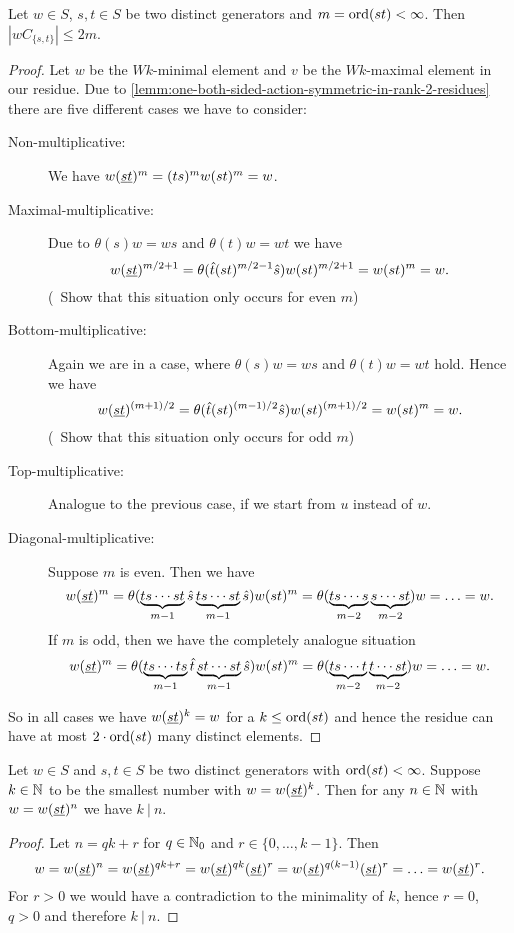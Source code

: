 \begin{lemm}
	Let $w \in S$, $s,t \in S$ be two distinct generators and $m = \operatorname{ord}(st) < \infty$. Then $|wC_{\{s,t\}}| \leq 2m$.

	\begin{proof}
		Let $w$ be the $Wk$-minimal element and $v$ be the $Wk$-maximal element in our residue. Due to \ref{lemm:one-both-sided-action-symmetric-in-rank-2-residues} there are five different cases we have to consider:
		\begin{description}
			\item[Non-multiplicative:] We have $w (\underline{s} \underline{t})^m = (ts)^m w (st)^m = w$.
			\item[Maximal-multiplicative:] Due to $\theta(s)w = ws$ and $\theta(t)w = wt$ we have
			$$ w (\underline{s} \underline{t})^{m/2+1} = \theta(\hat t (st)^{m/2-1} \hat s) w (st)^{m/2+1} = w(st)^m = w. $$
			(\todo \ Show that this situation only occurs for even $m$)
			\item[Bottom-multiplicative:] Again we are in a case, where $\theta(s)w = ws$ and $\theta(t)w = wt$ hold. Hence we have
			$$ w (\underline{s} \underline{t})^{(m+1)/2} = \theta(\hat t (st)^{(m-1)/2} \hat s) w (st)^{(m+1)/2} = w(st)^m = w. $$
			(\todo \ Show that this situation only occurs for odd $m$)
			\item[Top-multiplicative:] Analogue to the previous case, if we start from $u$ instead of $w$.
			\item[Diagonal-multiplicative:] Suppose $m$ is even. Then we have
			$$ w (\underline{s} \underline{t})^m = \theta(\underbrace{ts \cdots st}_{m-1} \hat s \underbrace{ts \cdots st}_{m-1} \hat s) w (st)^m = \theta(\underbrace{ts \cdots s}_{m-2} \underbrace{s \cdots st}_{m-2}) w = \ldots = w. $$
			If $m$ is odd, then we have the completely analogue situation
			$$ w (\underline{s} \underline{t})^m = \theta(\underbrace{ts \cdots ts}_{m-1} \hat t \underbrace{st \cdots st}_{m-1} \hat s) w (st)^m = \theta(\underbrace{ts \cdots t}_{m-2} \underbrace{t \cdots st}_{m-2}) w = \ldots = w. $$
		\end{description}
		So in all cases we have $w (\underline{s} \underline{t})^k = w$ for a $k \leq \operatorname{ord}(st)$ and hence the residue can have at most $2 \cdot \operatorname{ord}(st)$ many distinct elements.
	\end{proof}
\end{lemm}

\begin{prop}
	Let $w \in S$ and $s,t \in S$ be two distinct generators with $\operatorname{ord}(st) < \infty$. Suppose $k \in \mathbb{N}$ to be the smallest number with $w = w(\underline{s} \underline{t})^k$. Then for any $n \in \mathbb{N}$ with $w = w(\underline{s} \underline{t})^n$ we have $k \ | \ n$.

	\begin{proof}
		Let $n = qk + r$ for $q \in \mathbb{N}_0$ and $r \in \{0,\ldots,k-1\}$. Then
		$$ w = w(\underline{s} \underline{t})^n = w(\underline{s} \underline{t})^{qk+r} = w(\underline{s} \underline{t})^{qk} (\underline{s} \underline{t})^r = w (\underline{s} \underline{t})^{q(k-1)} (\underline{s} \underline{t})^r = \ldots = w(\underline{s} \underline{t})^r. $$
		For $r > 0$ we would have a contradiction to the minimality of $k$, hence $r = 0$, $q > 0$ and therefore $k \ | \ n$.
	\end{proof}
\end{prop}


